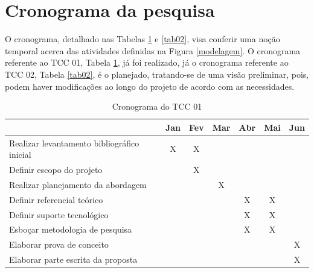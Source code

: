 \section{Cronograma da pesquisa}
O cronograma, detalhado nas Tabelas \ref{tab01} e \ref{tab02}, visa conferir uma noção temporal acerca das atividades definidas na Figura \ref{modelagem}. O cronograma referente ao TCC 01, Tabela \ref{tab01}, já foi realizado, já o cronograma referente ao TCC 02, Tabela \ref{tab02}, é o planejado, tratando-se de uma visão preliminar, pois, podem haver modificações ao longo do projeto de acordo com as necessidades.

\FloatBarrier
\begin{table}[h]
	\centering
	
	\begin{tabular}{lcccccc}
		\toprule
		& \textbf{Jan} & \textbf{Fev} & \textbf{Mar} & \textbf{Abr} & \textbf{Mai} & 		
		\textbf{Jun} \\
		\midrule
		Realizar levantamento bibliográfico inicial & X & X &  &  &  &  \\
		\midrule
		Definir escopo do projeto &  & X &  &  &  &  \\
		\midrule
		Realizar planejamento da abordagem &  &  & X &  &  &  \\
		\midrule
		Definir referencial teórico &  &  &  & X & X &  \\
		\midrule
		Definir suporte tecnológico &  &  &  & X & X &  \\
		\midrule
		Esboçar metodologia de pesquisa &  &  &  & X & X &  \\
		\midrule
		Elaborar prova de conceito &  &  &  &  &  & X \\
		\midrule
		Elaborar parte escrita da proposta &  &  &  &  &  & X \\
		\bottomrule
	\end{tabular}

	\caption{Cronograma do TCC 01}
	\label{tab01}
\end{table}

